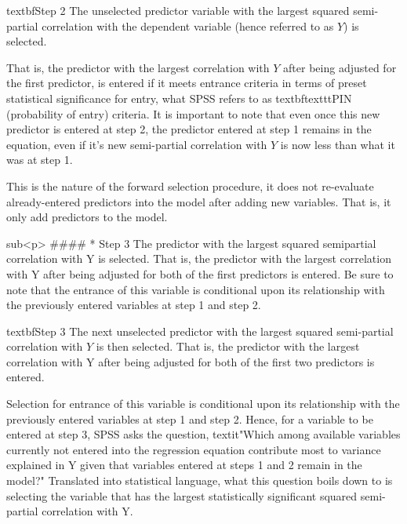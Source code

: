 textbf{Step 2}
The unselected predictor variable with the largest squared semi-partial correlation with the dependent variable (hence referred to as $Y$) is selected. 

That is, the predictor with the largest correlation with $Y$ after being adjusted for the first predictor, is entered if it meets entrance criteria in terms of preset statistical significance for entry, what SPSS refers to as
textbf{texttt{PIN}} (probability of entry) criteria. 
It is important to note that even once this new predictor is entered at step 2, the predictor entered at step 1 remains in the equation, even if it's new semi-partial correlation with $Y$ is now less than what it was at step 1. 

This is the nature of the forward selection procedure, it does not re-evaluate already-entered predictors into the model after adding new variables. That is, it only add predictors to the model. 


sub<p>
####        * {Step 3}
The predictor with the largest squared semipartial correlation with Y is selected. That is, the predictor with the largest correlation with Y after being adjusted for both of the first predictors is entered. Be sure to note that the entrance of this variable is conditional upon its relationship with the previously entered variables at step 1 and step 2. 

textbf{Step 3}
The next unselected predictor with the largest squared semi-partial correlation with $Y$ is then selected. That is, the predictor with the largest correlation with Y after being adjusted for both of the first two predictors is entered. 

Selection for entrance of this variable is conditional upon its relationship with the previously entered variables at step 1 and step 2. Hence, for a variable to be entered at step 3, SPSS asks the question, textit{"Which among available variables currently not entered into the regression equation contribute most to variance explained in Y given that variables entered at steps 1 and 2 remain in the model?"} Translated into statistical language, what this question boils down to is selecting the variable that has the largest statistically significant squared semi-partial correlation with Y.




